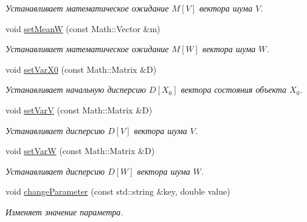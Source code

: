 \begin{DoxyCompactItemize}
\begin{DoxyCompactList}\small\item\em Устанавливает математическое ожидание $M[V]$ вектора шума $V$. \end{DoxyCompactList}\item 
void \hyperlink{class_core_1_1_task_aaf2c30082db74d2643ed382a92d3faf0}{set\+MeanW} (const Math\+::\+Vector \&m)\hypertarget{class_core_1_1_task_aaf2c30082db74d2643ed382a92d3faf0}{}\label{class_core_1_1_task_aaf2c30082db74d2643ed382a92d3faf0}

\begin{DoxyCompactList}\small\item\em Устанавливает математическое ожидание $M[W]$ вектора шума $W$. \end{DoxyCompactList}\item 
void \hyperlink{class_core_1_1_task_a206375f8b4993105a0edf965199e6f39}{set\+Var\+X0} (const Math\+::\+Matrix \&D)\hypertarget{class_core_1_1_task_a206375f8b4993105a0edf965199e6f39}{}\label{class_core_1_1_task_a206375f8b4993105a0edf965199e6f39}

\begin{DoxyCompactList}\small\item\em Устанавливает начальную дисперсию $D[X_0]$ вектора состояния объекта $X_0$. \end{DoxyCompactList}\item 
void \hyperlink{class_core_1_1_task_ae5fcf63bba5f0391e1bc932aec238a6e}{set\+VarV} (const Math\+::\+Matrix \&D)\hypertarget{class_core_1_1_task_ae5fcf63bba5f0391e1bc932aec238a6e}{}\label{class_core_1_1_task_ae5fcf63bba5f0391e1bc932aec238a6e}

\begin{DoxyCompactList}\small\item\em Устанавливает дисперсию $D[V]$ вектора шума $V$. \end{DoxyCompactList}\item 
void \hyperlink{class_core_1_1_task_ad326146b1416656c3e42138f0f7cadac}{set\+VarW} (const Math\+::\+Matrix \&D)\hypertarget{class_core_1_1_task_ad326146b1416656c3e42138f0f7cadac}{}\label{class_core_1_1_task_ad326146b1416656c3e42138f0f7cadac}

\begin{DoxyCompactList}\small\item\em Устанавливает дисперсию $D[W]$ вектора шума $W$. \end{DoxyCompactList}\item 
void \hyperlink{class_core_1_1_task_ac8b451d78816e62347954452b7ace250}{change\+Parameter} (const std\+::string \&key, double value)
\begin{DoxyCompactList}\small\item\em Изменяет значение параметра. \end{DoxyCompactList}\end{DoxyCompactItemize}

